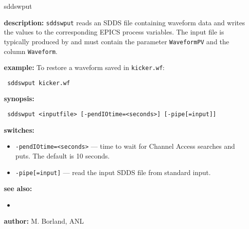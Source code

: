 \begin{sddsprog}{sddswput}
\item \textbf{description:}
  \verb+sddswput+ reads an SDDS file containing waveform data and writes the
  values to the corresponding EPICS process variables.  The input file is
  typically produced by  and must contain the parameter
  \verb|WaveformPV| and the column \verb|Waveform|.

\item \textbf{example:}
  To restore a waveform saved in \verb|kicker.wf|:
  \begin{flushleft}{\tt
  sddswput kicker.wf
  }\end{flushleft}

\item \textbf{synopsis:}
  \begin{flushleft}{\tt
  sddswput <inputfile>\
      [-pendIOtime=<seconds>] [-pipe[=input]]
  }\end{flushleft}

\item \textbf{switches:}
  \begin{itemize}
  \item {\tt -pendIOtime=<seconds>} --- time to wait for Channel Access searches and puts. The default is 10 seconds.
  \item {\tt -pipe[=input]} --- read the input SDDS file from standard input.
  \end{itemize}

\item \textbf{see also:}
  \begin{itemize}
  \item {}
  \end{itemize}

\item \textbf{author:} M. Borland, ANL
\end{sddsprog}
